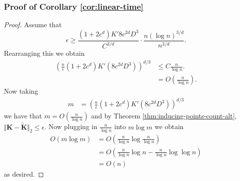 \subsubsection{Proof of Corollary \ref{cor:linear-time}}\label{proof:cor-linear-time}
\corlineartime*
\begin{proof}

Assume that
$$
\epsilon \geq \frac{(1 + 2c^d) K' 8 c^{2d} D^3}{C^{3/d}} \cdot \frac{n (\log n)^{3/d}}{n^{3/d}}.
$$
Rearranging this we obtain
\begin{align*}
    \left( \frac{n}{\epsilon} (1 + 2c^d) K' (8 c^{2d} D^3) \right)^{d/3}&\leq C\frac{n}{\log n}.\\
    &=O\left(\frac{n}{\log n}\right).
\end{align*}
Now taking 
\begin{align*}
    m &= \left( \frac{n}{\epsilon} (1 + 2c^d) K' (8 c^{2d} D^3) \right)^{d/3}
\end{align*}
we have that $m=O\left(\frac{n}{\log n}\right)$ and by Theorem \ref{thm:inducing-points-count-alt}, $\Vert \textbf{K}-\tilde{\textbf{K}}\Vert_2\leq \epsilon$. Now plugging in $\frac{n}{\log n}$ into $m\log m$ we obtain
\begin{align*}
    O\left(m\log m\right)&=O\left(\frac{n}{\log n}\log \frac{n}{\log n}\right)\\
    &=O\left(\frac{n}{\log n}\log n-\frac{n}{\log n}\log \log n\right)\\
    &=O(n)
\end{align*}
as desired.
\end{proof}

